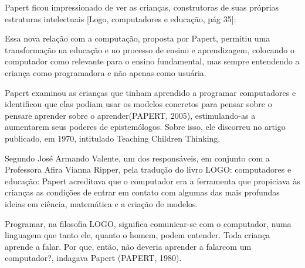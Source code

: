 \documentclass[
12pt,		%
openright,	%
twoside,  %
a4paper,			%
chapter=TITLE,		%
english,			%
french,				%
spanish,			%
brazil				%
]{USPSC-classe/USPSC}
\begin{document}
Papert ficou impressionado de ver as crian\c{c}as, construtoras de suas pr\'oprias estruturas intelectuais [Logo, computadores e educa\c{c}\~ao, p\'ag 35]:









\noindent\begin{center}\mbox{\centering{}}\end{center}


Essa nova rela\c{c}\~ao com a computa\c{c}\~ao, proposta por Papert, permitiu uma transforma\c{c}\~ao na educa\c{c}\~ao e no processo de ensino e aprendizagem, colocando o computador como relevante para o ensino fundamental, mas sempre entendendo a crian\c{c}a como programadora e n\~ao apenas como usu\'aria.








Papert examinou as crian\c{c}as que tinham aprendido a programar computadores e identificou que elas podiam usar os modelos concretos para \textquotedbl pensar sobre o pensar\textquotedbl  e \textquotedbl aprender sobre o aprender\textquotedbl   (PAPERT, 2005), estimulando-as  a aumentarem seus poderes de epistem\'ologos. Sobre isso, ele discorreu no artigo publicado, em 1970, intitulado Teaching Children Thinking.








Segundo Jos\'e Armando Valente, um dos respons\'aveis, em conjunto com a Professora Afira Vianna Ripper, pela tradu\c{c}\~ao do livro LOGO: computadores e educa\c{c}\~ao: \textquotedbl Papert acreditava que o computador era a ferramenta que propiciava \`as crian\c{c}as as condi\c{c}\~oes de entrar em contato com algumas das mais profundas ideias em ci\^encia, matem\'atica e a cria\c{c}\~ao de modelos\textquotedbl .








Programar, na filosofia LOGO, significa \textquotedbl comunicar-se com o computador, numa linguagem que tanto ele, quanto o homem,  podem entender\textquotedbl . Toda crian\c{c}a aprende a falar. Por que, ent\~ao, n\~ao deveria aprender a \textquotedbl falar\textquotedbl  com um computador?\textquotedbl , indagava Papert  (PAPERT, 1980).
\end{document}
